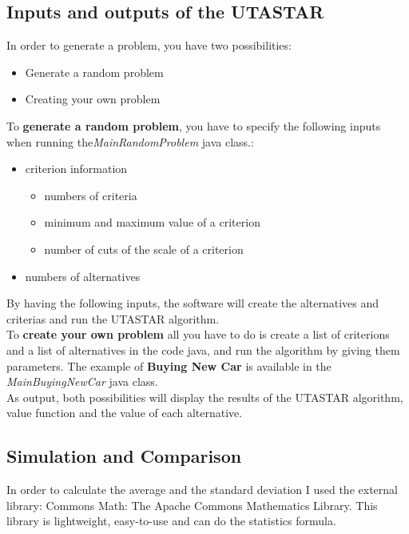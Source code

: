 \documentclass{report}
\begin{document}
\subsection{Inputs and outputs of the UTASTAR}
In order to generate a problem, you have two possibilities:
\begin{itemize}
\item Generate a random problem
\item Creating your own problem
\end{itemize}
To \textbf{generate a random problem}, you have to specify the following inputs when running the\textit{MainRandomProblem} java class.:
\begin{itemize}
\item criterion information
\begin{itemize}
\item numbers of criteria
\item minimum and maximum value of a criterion
\item number of cuts of the scale of a criterion
\end{itemize}
\item numbers of alternatives
\end{itemize}
By having the following inputs, the software will create the alternatives and criterias and run the UTASTAR algorithm.\\
To \textbf{create your own problem} all you have to do is create a list of criterions and a list of alternatives in the code java, and run the algorithm by giving them parameters. The example of \textbf{Buying New Car} is available in the \textit{MainBuyingNewCar} java class. \\

As output, both possibilities will display the results of the UTASTAR algorithm, value function and the value of each alternative.\\

\subsection{Simulation and Comparison}
In order to calculate the average and the standard deviation I used the external library: Commons Math: The Apache Commons Mathematics Library. This library is lightweight, easy-to-use and can do the statistics formula.
\end{document}
